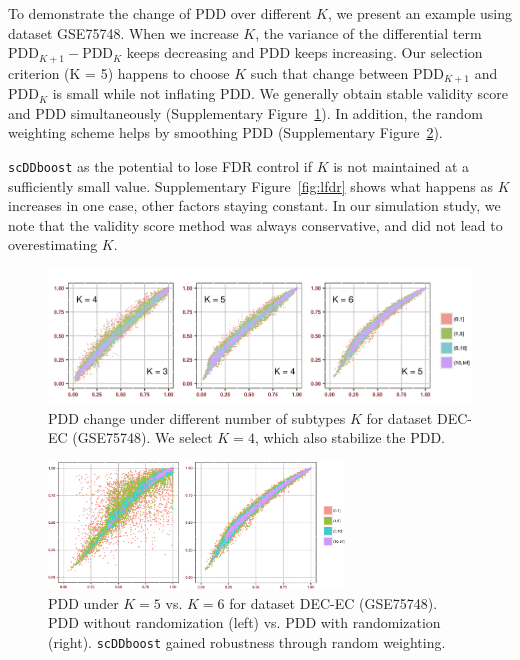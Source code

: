 \documentclass[aoas,preprint]{imsart}
\begin{document}
To demonstrate the change of PDD over different $K$, we present an example using dataset
GSE75748. When we increase $K$, the variance of the differential term $\text{PDD}_{K + 1} - \text{PDD}_K$ keeps decreasing and PDD keeps increasing. Our selection criterion (K = 5) happens to choose $K$ such that change between $\text{PDD}_{K + 1}$ and $\text{PDD}_K$ is small while not inflating PDD. We generally obtain stable validity score and PDD simultaneously (Supplementary Figure~\ref{fig:rwk}). In addition, the random weighting scheme helps by smoothing PDD (Supplementary Figure~\ref{fig:s10}).

\texttt{scDDboost} as the potential to lose FDR control if $K$ is not maintained at
a sufficiently small value.  Supplementary Figure~\ref{fig:lfdr} shows what happens as $K$ increases
in one case, other factors staying constant.
In our simulation study, we note that the validity score method was always conservative, and did
not lead to overestimating $K$.

\begin{figure}[h]
\includegraphics[width = 1\textwidth]{Figs/Kchange.png}
\caption{PDD change under different number of subtypes $K$ for dataset DEC-EC (GSE75748). We select $K = 4$, which also stabilize the PDD.}
\label{fig:rwk}
\end{figure}

\begin{figure}[h]
\includegraphics[width = 0.7\textwidth]{Figs/rw.pdf}
\caption{PDD under $K = 5$ vs. $K = 6$ for dataset DEC-EC (GSE75748). PDD without randomization (left) vs. PDD with randomization (right). \texttt{scDDboost} gained robustness through random weighting.}
\label{fig:s10}
\end{figure}
\end{document}
